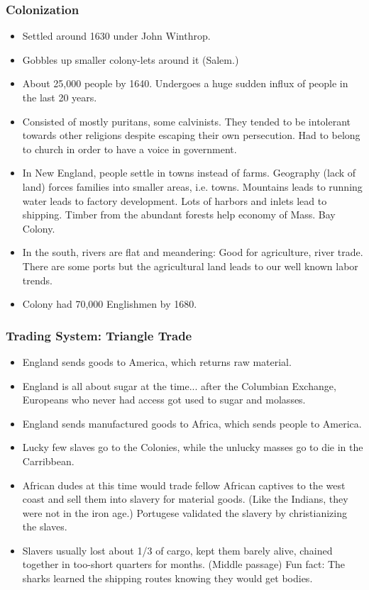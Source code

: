 \documentclass{article}
\begin{document}
      \subsubsection{Colonization}
        \begin{itemize}
          \item Settled around 1630 under John Winthrop.
          \item Gobbles up smaller colony-lets around it (Salem.) 
          \item About 25,000 people by 1640. Undergoes a huge sudden influx of people in the last 20 years.
          \item Consisted of mostly puritans, some calvinists. They tended to be intolerant towards other religions despite escaping their own persecution. Had to belong to church in order to have a voice in government.
          \item In New England, people settle in towns instead of farms. Geography (lack of land) forces families into smaller areas, i.e. towns. Mountains leads to running water leads to factory development. Lots of harbors and inlets lead to shipping. Timber from the abundant forests help economy of Mass. Bay Colony.
          \item In the south, rivers are flat and meandering: Good for agriculture, river trade. There are some ports but the agricultural land leads to our well known labor trends.
          \item Colony had 70,000 Englishmen by 1680.
        \end{itemize}

      \subsubsection{Trading System: Triangle Trade}
        \begin{itemize}
          \item England sends goods to America, which returns raw material.
          \item England is all about sugar at the time... after the Columbian Exchange, Europeans who never had access got used to sugar and molasses.
          \item England sends manufactured goods to Africa, which sends people to America.
          \item Lucky few slaves go to the Colonies, while the unlucky masses go to die in the Carribbean.
          \item African dudes at this time would trade fellow African captives to the west coast and sell them into slavery for material goods. (Like the Indians, they were not in the iron age.) Portugese validated the slavery by christianizing the slaves. 
          \item Slavers usually lost about 1/3 of cargo, kept them barely alive, chained together in too-short quarters for months. (Middle passage) Fun fact: The sharks learned the shipping routes knowing they would get bodies.
        \end{itemize}
\end{document}
